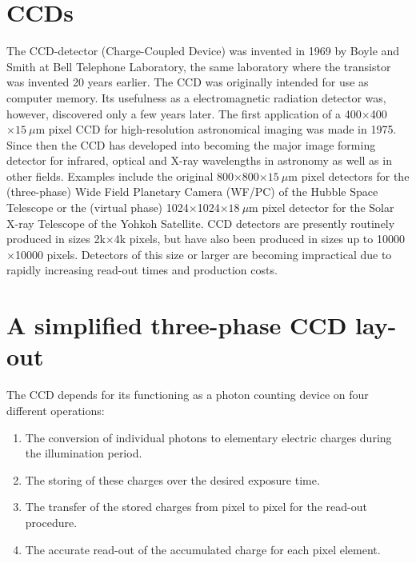 \section{CCDs}

The CCD-detector (Charge-Coupled Device) was invented in 1969 by Boyle
and Smith at Bell Telephone Laboratory, the same laboratory where the
transistor was invented 20 years earlier. The CCD was originally
intended for use as computer memory. Its usefulness as a
electromagnetic radiation detector was, however, discovered only a few
years later. The first application of a 400$\times$400$\times 15~\mu$m
pixel CCD for high-resolution astronomical imaging was made in
1975. Since then the CCD has developed into becoming the major image
forming detector for infrared, optical and X-ray wavelengths in
astronomy as well as in other fields.  Examples include the original
800$\times$800$\times 15~\mu$m pixel detectors for the (three-phase)
Wide Field Planetary Camera (WF/PC) of the Hubble Space Telescope or
the (virtual phase) 1024$\times$1024$\times 18~\mu$m pixel detector
for the Solar X-ray Telescope of the Yohkoh Satellite. CCD detectors
are presently routinely produced in sizes 2k$\times$4k pixels, but
have also been produced in sizes up to 10000$\times$10000
pixels. Detectors of this size or larger are becoming impractical due
to rapidly increasing read-out times and production costs.

\section{A simplified three-phase CCD lay-out}

The CCD depends for its functioning as a photon counting device on
four different operations:
\begin{enumerate}
	\item The conversion of individual photons to
	elementary electric charges during the illumination period.
	\item The
	storing of these charges over the desired exposure time.
	\item The
	transfer of the stored charges from pixel to pixel for the read-out
	procedure.
	\item	The accurate read-out of the accumulated
	charge for each pixel element. 
\end{enumerate}

